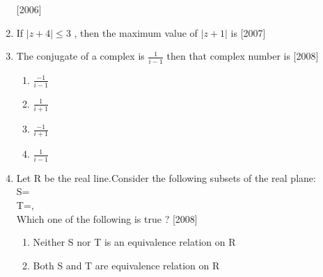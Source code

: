 \documentclass[journal,12pt,twocolumn,article]{IEEEtran}
\theoremstyle{remark}
\begin{document}
\begin{enumerate}[start = 14]
\hfill{[2006]}
\begin{enumerate}
\end{enumerate}
\item If $|z+4|\leq 3$ , then the maximum value of $|z+1|$ is
\hfill{[2007]}                                     
\begin{enumerate}                                  
\end{enumerate}
\item The conjugate of a complex is $\frac{1}{i-1}$ then that complex number is
\hfill{[2008]}
\begin{multicols}{4}
\begin{enumerate}
\item $\frac{-1}{i-1}$
\item $\frac{1}{i+1}$
\item $\frac{-1}{i+1}$
\item $\frac{1}{i-1}$
\end{enumerate}
\end{multicols}
\item Let R be the real line.Consider the following
subsets of the real plane: \\S= \\ T=, \\Which one of the following is true ?
\hfill{[2008]}
\begin{enumerate}
\item Neither S nor T is an equivalence relation on R                                        
                                
\item Both S and T are equivalence relation on R   
                                

\end{enumerate}
\end{enumerate}
\end{document}

